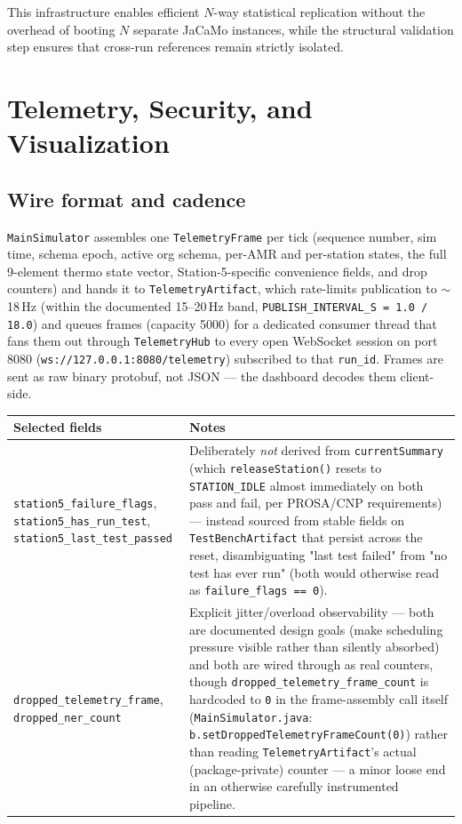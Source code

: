 \documentclass[twocolumn,10pt,a4paper]{article}
\newcommand{\code}[1]{\texttt{\small #1}}
\newcommand{\file}[1]{\texttt{#1}}
\begin{document}
This infrastructure enables efficient $N$-way statistical replication without the overhead of booting $N$ separate JaCaMo instances, while the structural validation step ensures that cross-run references remain strictly isolated.

\section{Telemetry, Security, and Visualization}
\label{ch:telemetry}

\subsection{Wire format and cadence}
\code{MainSimulator} assembles one \code{TelemetryFrame} per tick (sequence number, sim time, schema epoch, active org schema, per-AMR and per-station states, the full 9-element thermo state vector, Station-5-specific convenience fields, and drop counters) and hands it to \code{TelemetryArtifact}, which rate-limits publication to $\sim$18\,Hz (within the documented 15--20\,Hz band, \code{PUBLISH\_INTERVAL\_S = 1.0 / 18.0}) and queues frames (capacity 5000) for a dedicated consumer thread that fans them out through \code{TelemetryHub} to every open WebSocket session on port 8080 (\code{ws://127.0.0.1:8080/telemetry}) subscribed to that \code{run\_id}. Frames are sent as raw binary protobuf, not JSON --- the dashboard decodes them client-side.

\begin{table}[t]
\centering
\small
\begin{tabular}{@{}p{4.0cm}p{12.7cm}@{}}
\toprule
\textbf{Selected fields} & \textbf{Notes} \\
\midrule
\code{station5\_failure\_flags}, \code{station5\_has\_run\_test}, \code{station5\_last\_test\_passed} & Deliberately \emph{not} derived from \code{currentSummary} (which \code{releaseStation()} resets to \code{STATION\_IDLE} almost immediately on both pass and fail, per PROSA/CNP requirements) --- instead sourced from stable fields on \code{TestBenchArtifact} that persist across the reset, disambiguating "last test failed" from "no test has ever run" (both would otherwise read as \code{failure\_flags == 0}). \\
\code{dropped\_telemetry\_frame}, \code{dropped\_ner\_count} & Explicit jitter/overload observability --- both are documented design goals (make scheduling pressure visible rather than silently absorbed) and both are wired through as real counters, though \code{dropped\_telemetry\_frame\_count} is hardcoded to \code{0} in the frame-assembly call itself (\file{MainSimulator.java}: \code{b.setDroppedTelemetryFrameCount(0)}) rather than reading \code{TelemetryArtifact}'s actual (package-private) counter --- a minor loose end in an otherwise carefully instrumented pipeline. \\
\bottomrule
\end{tabular}
\end{table}
\end{document}
